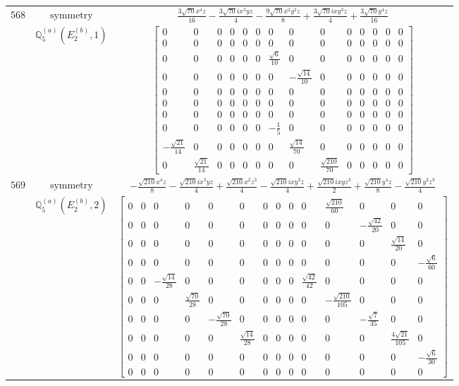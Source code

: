 \documentclass[fleqn,8pt,landscape]{jsarticle}
\begin{document}
\begin{longtable}{ccc}
$ 568 $ & $ \text{symmetry} $ & $ \frac{3 \sqrt{70} x^{4} z}{16} - \frac{3 \sqrt{70} i x^{3} y z}{4} - \frac{9 \sqrt{70} x^{2} y^{2} z}{8} + \frac{3 \sqrt{70} i x y^{3} z}{4} + \frac{3 \sqrt{70} y^{4} z}{16} $ \\
$  $ & $ \mathbb{Q}_{5}^{(a)}(E_{2}^{(b)},1) $ & $ \begin{bmatrix} 0 & 0 & 0 & 0 & 0 & 0 & 0 & 0 & 0 & 0 & 0 & 0 & 0 & 0 \\ 0 & 0 & 0 & 0 & 0 & 0 & 0 & 0 & 0 & 0 & 0 & 0 & 0 & 0 \\ 0 & 0 & 0 & 0 & 0 & 0 & \frac{\sqrt{6}}{10} & 0 & 0 & 0 & 0 & 0 & 0 & 0 \\ 0 & 0 & 0 & 0 & 0 & 0 & 0 & - \frac{\sqrt{14}}{10} & 0 & 0 & 0 & 0 & 0 & 0 \\ 0 & 0 & 0 & 0 & 0 & 0 & 0 & 0 & 0 & 0 & 0 & 0 & 0 & 0 \\ 0 & 0 & 0 & 0 & 0 & 0 & 0 & 0 & 0 & 0 & 0 & 0 & 0 & 0 \\ 0 & 0 & 0 & 0 & 0 & 0 & 0 & 0 & 0 & 0 & 0 & 0 & 0 & 0 \\ 0 & 0 & 0 & 0 & 0 & 0 & - \frac{1}{5} & 0 & 0 & 0 & 0 & 0 & 0 & 0 \\ - \frac{\sqrt{21}}{14} & 0 & 0 & 0 & 0 & 0 & 0 & \frac{\sqrt{14}}{70} & 0 & 0 & 0 & 0 & 0 & 0 \\ 0 & \frac{\sqrt{21}}{14} & 0 & 0 & 0 & 0 & 0 & 0 & \frac{\sqrt{210}}{70} & 0 & 0 & 0 & 0 & 0 \end{bmatrix} $ \\ \hline
$ 569 $ & $ \text{symmetry} $ & $ - \frac{\sqrt{210} x^{4} z}{8} - \frac{\sqrt{210} i x^{3} y z}{4} + \frac{\sqrt{210} x^{2} z^{3}}{4} - \frac{\sqrt{210} i x y^{3} z}{4} + \frac{\sqrt{210} i x y z^{3}}{2} + \frac{\sqrt{210} y^{4} z}{8} - \frac{\sqrt{210} y^{2} z^{3}}{4} $ \\
$  $ & $ \mathbb{Q}_{5}^{(a)}(E_{2}^{(b)},2) $ & $ \begin{bmatrix} 0 & 0 & 0 & 0 & 0 & 0 & 0 & 0 & 0 & 0 & \frac{\sqrt{210}}{60} & 0 & 0 & 0 \\ 0 & 0 & 0 & 0 & 0 & 0 & 0 & 0 & 0 & 0 & 0 & - \frac{\sqrt{42}}{20} & 0 & 0 \\ 0 & 0 & 0 & 0 & 0 & 0 & 0 & 0 & 0 & 0 & 0 & 0 & \frac{\sqrt{14}}{20} & 0 \\ 0 & 0 & 0 & 0 & 0 & 0 & 0 & 0 & 0 & 0 & 0 & 0 & 0 & - \frac{\sqrt{6}}{60} \\ 0 & 0 & - \frac{\sqrt{14}}{28} & 0 & 0 & 0 & 0 & 0 & 0 & \frac{\sqrt{42}}{42} & 0 & 0 & 0 & 0 \\ 0 & 0 & 0 & \frac{\sqrt{70}}{28} & 0 & 0 & 0 & 0 & 0 & 0 & - \frac{\sqrt{210}}{105} & 0 & 0 & 0 \\ 0 & 0 & 0 & 0 & - \frac{\sqrt{70}}{28} & 0 & 0 & 0 & 0 & 0 & 0 & - \frac{\sqrt{7}}{35} & 0 & 0 \\ 0 & 0 & 0 & 0 & 0 & \frac{\sqrt{14}}{28} & 0 & 0 & 0 & 0 & 0 & 0 & \frac{4 \sqrt{21}}{105} & 0 \\ 0 & 0 & 0 & 0 & 0 & 0 & 0 & 0 & 0 & 0 & 0 & 0 & 0 & - \frac{\sqrt{6}}{30} \\ 0 & 0 & 0 & 0 & 0 & 0 & 0 & 0 & 0 & 0 & 0 & 0 & 0 & 0 \end{bmatrix} $ \\ \hline

\end{longtable}
\end{document}
